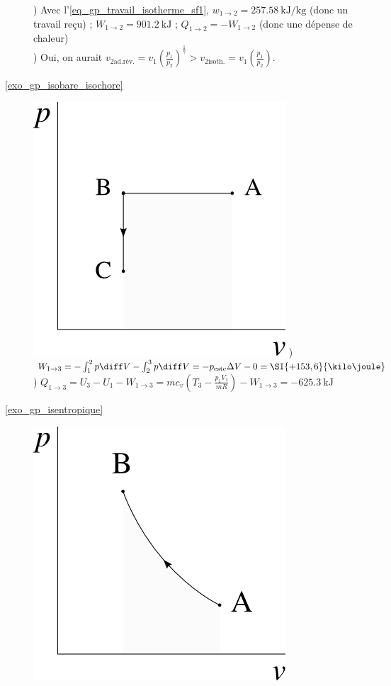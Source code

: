 \begin{description}
					) Avec l’\cref{eq_gp_travail_isotherme_sf1}, $w_{1 \to 2} = \SI{+257,58}{\kilo\joule\per\kilogram}$ (donc un travail reçu) ; $W_{1 \to 2} = \SI{+901,2}{\kilo\joule}$ ; $Q_{1 \to 2} = - W_{1 \to 2}$ (donc une dépense de chaleur)\\
				 	) Oui, on aurait $v_{2 \text{ad.rév.}} = v_1 \left(\frac{p_1}{p_2}\right)^{\frac{1}{\gamma}} > v_{2 \text{isoth.}} =  v_1 \left(\frac{p_1}{p_2}\right)$. 
	\item [\ref{exo_gp_isobare_isochore}] 
					\includegraphics[width=\solutiondiagramwidth]{images/exo_sol_pv_isob_isoch.png}
					) $W_{1 \to 3} = -\int_1^2 p \diff V  - \int_2^3 p \diff V = -p_\text{cste} \Delta V - 0 = \SI{+153,6}{\kilo\joule}$	
					) $Q_{1 \to 3} = U_3 - U_1 - W_{1 \to 3} = m c_v \left(T_3 - \frac{p_1 V_1}{m R}\right) - W_{1 \to 3} = \SI{-625,3}{\kilo\joule}$
	\item [\ref{exo_gp_isentropique}]
					\includegraphics[width=\solutiondiagramwidth]{images/exo_sol_pv_isentr.png}

\end{description}
